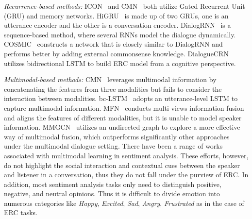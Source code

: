 \documentclass[lettersize,journal]{IEEEtran}
\begin{document}
\textit{Recurrence-based methods:} ICON~\cite{hazarika2018icon} and CMN~\cite{hazarika2018conversational} both utilize Gated Recurrent Unit (GRU) and memory networks. HiGRU~\cite{jiao2019higru} is made up of two GRUs, one is an utterance encoder and the other is a conversation encoder. DialogRNN~\cite{majumder2019dialoguernn} is a sequence-based method, where several RNNs model the dialogue dynamically. COSMIC~\cite{ghosal2020cosmic} constructs a network that is closely similar to DialogRNN and performs better by adding external commonsense knowledge. DialogueCRN~\cite{hu2021dialoguecrn} utilizes bidirectional LSTM to build ERC model from a cognitive perspective.

\textit{Multimodal-based methods:} CMN~\cite{hazarika2018conversational} leverages multimodal information by concatenating the features from three modalities but fails to consider the interaction between modalities. bc-LSTM~\cite{poria2017context} adopts an utterance-level LSTM to capture multimodal information. MFN~\cite{sahay2018multimodal} conducts multi-views information fusion and aligns the features of different modalities, but it is unable to model speaker information. MMGCN~\cite{hu2021mmgcn} utilizes an undirected graph to explore a more effective way of multimodal fusion, which outperforms significantly other approaches under the multimodal dialogue setting. There have been a range of works~\cite{tsai2018learning,tsai2019multimodal,hazarika2020misa,sun2020learning} associated with multimodal learning in sentiment analysis. These efforts, however, do not highlight the social interaction and contextual cues between the speaker and listener in a conversation, thus they do not fall under the purview of ERC. In addition, most sentiment analysis tasks only need to distinguish positive, negative, and neutral opinions. Thus it is difficult to divide emotion into numerous categories like \textit{Happy}, \textit{Excited}, \textit{Sad}, \textit{Angry}, \textit{Frustrated} as in the case of ERC tasks.
\end{document}
